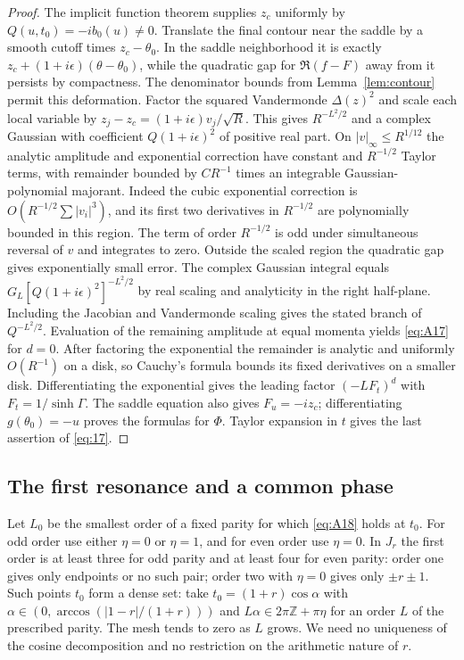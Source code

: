 \documentclass[11pt,a4paper]{article}
\numberwithin{equation}{section}
\theoremstyle{plain}
\theoremstyle{definition}
\begin{document}
\begin{proof}
The implicit function theorem supplies $z_c$ uniformly by $Q(u,t_0)=-ib_0(u)\ne0$. Translate the final contour near the saddle by a smooth cutoff times $z_c-\theta_0$. In the saddle neighborhood it is exactly $z_c+(1+i\epsilon)(\theta-\theta_0)$, while the quadratic gap for $\Re(f-F)$ away from it persists by compactness. The denominator bounds from Lemma~\ref{lem:contour} permit this deformation. Factor the squared Vandermonde $\Delta(z)^2$ and scale each local variable by $z_j-z_c=(1+i\epsilon)v_j/\sqrt R$. This gives $R^{-L^2/2}$ and a complex Gaussian with coefficient $Q(1+i\epsilon)^2$ of positive real part. On $|v|_\infty\le R^{1/12}$ the analytic amplitude and exponential correction have constant and $R^{-1/2}$ Taylor terms, with remainder bounded by $C R^{-1}$ times an integrable Gaussian-polynomial majorant. Indeed the cubic exponential correction is $O(R^{-1/2}\sum|v_i|^3)$, and its first two derivatives in $R^{-1/2}$ are polynomially bounded in this region. The term of order $R^{-1/2}$ is odd under simultaneous reversal of $v$ and integrates to zero. Outside the scaled region the quadratic gap gives exponentially small error. The complex Gaussian integral equals $G_L[Q(1+i\epsilon)^2]^{-L^2/2}$ by real scaling and analyticity in the right half-plane. Including the Jacobian and Vandermonde scaling gives the stated branch of $Q^{-L^2/2}$. Evaluation of the remaining amplitude at equal momenta yields \eqref{eq:A17} for $d=0$. After factoring the exponential the remainder is analytic and uniformly $O(R^{-1})$ on a disk, so Cauchy's formula bounds its fixed derivatives on a smaller disk. Differentiating the exponential gives the leading factor $(-LF_t)^d$ with $F_t=1/\sinh\Gamma$. The saddle equation also gives $F_u=-iz_c$; differentiating $g(\theta_0)=-u$ proves the formulas for $\Phi$. Taylor expansion in $t$ gives the last assertion of \eqref{eq:17}.
\end{proof}

\subsection{The first resonance and a common phase}\label{sec:realratio}
Let $L_0$ be the smallest order of a fixed parity for which \eqref{eq:A18} holds at $t_0$. For odd order use either $\eta=0$ or $\eta=1$, and for even order use $\eta=0$. In $J_r$ the first order is at least three for odd parity and at least four for even parity: order one gives only endpoints or no such pair; order two with $\eta=0$ gives only $\pm r\pm1$. Such points $t_0$ form a dense set: take $t_0=(1+r)\cos\alpha$ with $\alpha\in(0,\arccos(|1-r|/(1+r)))$ and $L\alpha\in2\pi\mathbb Z+\pi\eta$ for an order $L$ of the prescribed parity. The mesh tends to zero as $L$ grows. We need no uniqueness of the cosine decomposition and no restriction on the arithmetic nature of $r$.
\end{document}
